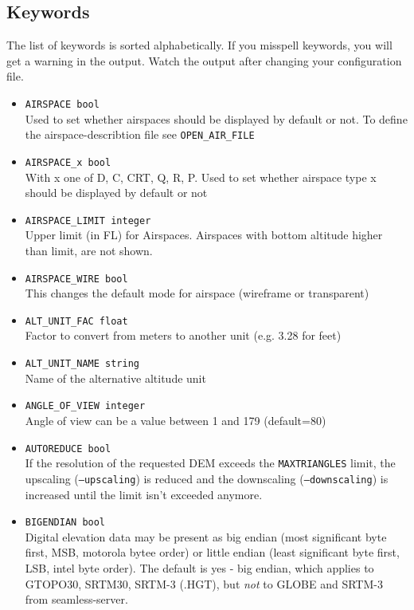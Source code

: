 \subsection{Keywords}
The list of keywords is sorted alphabetically.
If you misspell keywords, you will get a warning in the output. Watch the output after changing your configuration file.

\begin{itemize}

\item \texttt{AIRSPACE bool} \\
Used to set whether airspaces should be displayed by default or not. To define the airspace-describtion file see \texttt{OPEN\_AIR\_FILE}

\item \texttt{AIRSPACE\_x bool} \\
With x one of D, C, CRT, Q, R, P. Used to set whether airspace type x should be displayed by default or not

\item \texttt{AIRSPACE\_LIMIT integer} \\
Upper limit (in FL) for Airspaces. Airspaces with bottom altitude higher than limit, are not shown.

\item \texttt{AIRSPACE\_WIRE bool} \\
This changes the default mode for airspace (wireframe or transparent)

\item \texttt{ALT\_UNIT\_FAC float} \\
Factor to convert from meters to another unit (e.g. 3.28 for feet)

\item \texttt{ALT\_UNIT\_NAME string} \\
Name of the alternative altitude unit

\item \texttt{ANGLE\_OF\_VIEW integer} \\
Angle of view can be a value between 1 and 179 (default=80)

\item \texttt{AUTOREDUCE bool} \\
If the resolution of the requested DEM exceeds the \texttt{MAXTRIANGLES} limit, the upscaling (\texttt{--upscaling}) is reduced and the
downscaling (\texttt{--downscaling}) is increased until the limit isn't exceeded anymore.

\item \texttt{BIGENDIAN bool} \\
Digital elevation data may be present as big endian (most significant byte first, MSB, motorola bytee order) or little endian
(least significant byte first, LSB, intel byte order). The default is yes - big endian, which applies to GTOPO30, SRTM30, SRTM-3 (.HGT),
but \emph{not} to GLOBE and SRTM-3 from seamless-server.


\end{itemize}
